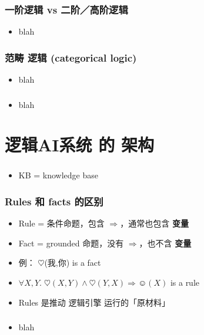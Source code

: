 \documentclass[15pt]{beamer}
\begin{document}
\begin{frame}
\frametitle{一阶逻辑 vs 二阶／高阶逻辑}
\begin{itemize}
	\item blah
\end{itemize}
\end{frame}


\begin{frame}
\frametitle{范畴 逻辑 (categorical logic)}
\begin{itemize}
	\item blah
\end{itemize}
\end{frame}

\begin{frame}
\frametitle{}
\begin{itemize}
	\item blah
\end{itemize}
\end{frame}

\section[Section]{逻辑AI系统 的 架构}
\frame{\sectionpage}

\begin{frame}
\frametitle{}
\begin{itemize}
	\item KB = knowledge base
\end{itemize}
\end{frame}


\begin{frame}
\frametitle{Rules 和 facts 的区别}
\begin{itemize}
	\item Rule = 条件命题，包含 $\Rightarrow$，通常也包含 \textbf{变量}
	\item Fact = grounded 命题，没有 $\Rightarrow$，也不含 \textbf{变量}
	\item 例： $\heartsuit$(我,你) is a fact
	\item $ \forall X,Y. \; \heartsuit(X,Y) \wedge \heartsuit(Y,X) \Rightarrow \smiley(X) $ is a rule
	\item Rules 是推动 逻辑引擎 运行的「原材料」
\end{itemize}
\end{frame}



\begin{frame}
\frametitle{}
\begin{itemize}
	\item blah
\end{itemize}
\end{frame}
\end{document}
